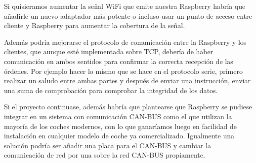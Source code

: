 \documentclass{pclass}
\begin{document}
	Si quisieramos aumentar la señal WiFi que emite nuestra Raspberry habría que añadirle un nuevo adaptador más potente o incluso usar un punto de acceso entre cliente y Raspberry para aumentar la cobertura de la señal.
	
	Además podría mejorarse el protocolo de comunicación entre la Raspberry y los clientes, que aunque esté implementada sobre TCP, debería de haber comunicación en ambos sentidos para confirmar la correcta recepción de las órdenes. Por ejemplo hacer lo mismo que se hace en el protocolo serie, primero realizar un saludo entre ambas partes y después de enviar una instrucción, enviar una suma de comprobación para comprobar la integridad de los datos.
	
	Si el proyecto continuase, además habría que plantearse que Raspberry se pudiese integrar en un sistema con comunicación CAN-BUS como el que utilizan la mayoría de los coches modernos, con lo que ganaríamos luego en facilidad de instalación en cualquier modelo de coche ya comercializado. Igualmente una solución podría ser añadir una placa para el CAN-BUS y cambiar la comunicación de red por una sobre la red CAN-BUS propiamente.


	
	
	 
	


\end{document}
